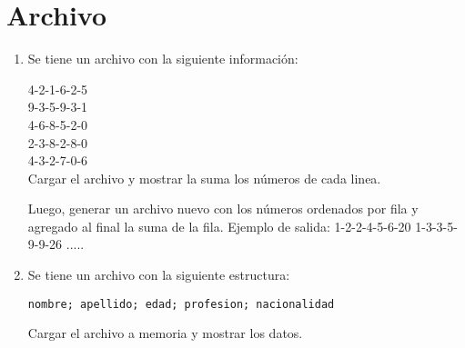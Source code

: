 \chapter{Archivo}

 \begin{enumerate}[resume]

  \item Se tiene un archivo con la siguiente información:
  
  4-2-1-6-2-5 \\
  9-3-5-9-3-1 \\
  4-6-8-5-2-0 \\
  2-3-8-2-8-0 \\
  4-3-2-7-0-6 \\
  
  Cargar el archivo y mostrar la suma los números de cada linea.
  
  
  Luego, generar un archivo nuevo con los números ordenados por fila y agregado al final la suma de la fila.
  Ejemplo de salida:
  1-2-2-4-5-6-20
  1-3-3-5-9-9-26
  .....
  
  
  
  \item Se tiene un archivo con la siguiente estructura:
	  
	  \texttt{nombre; apellido; edad; profesion; nacionalidad}
	  
	Cargar el archivo a memoria y mostrar los datos.
	
	






\end{enumerate}

